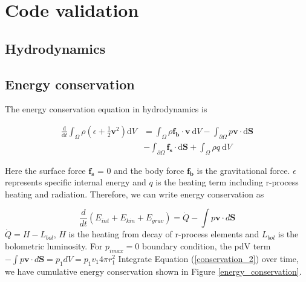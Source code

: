 \documentclass[fleqn,usenatbib]{mnras}
\begin{document}
\section{Code validation}
\subsection{Hydrodynamics}
\subsection{Energy conservation}

The energy conservation equation in hydrodynamics is 

 \begin{equation}
 \label{conservation_1}
 \begin{aligned}
 	 	\frac{\mathrm{d}}{\mathrm{d} t} \int_{\Omega} \rho\left(\epsilon+\frac{1}{2} \boldsymbol{v}^{2}\right) \mathrm{d} V & =\int_{\Omega} \rho \boldsymbol{f_b} \cdot \boldsymbol{v} \mathrm{~d} V -\int_{\partial \Omega} p \boldsymbol{v} \cdot \mathrm{d} \boldsymbol{S} \\&-\int_{\partial \Omega} \boldsymbol{f_s} \cdot \mathrm{d} \boldsymbol{S}+\int_{\Omega} \rho q \mathrm{~d}V
 \end{aligned}
 \end{equation}
 
 Here the surface force $\boldsymbol{f_s}$ = 0 and the body force $\boldsymbol{f_b}$ is the gravitational force. $\epsilon$ represents specific internal energy and $q$ is the heating term including r-process heating and radiation. Therefore, we can write energy conservation as
 



\begin{equation}
\label{conservation_2}
	\frac{d}{dt}(E_{int} + E_{kin}+E_{grav}) = \dot Q - \int p \boldsymbol{v} \cdot d \boldsymbol{S} 
\end{equation}
$\dot Q = H - L_{bol}$, $H$ is the heating from decay of r-process elements and $L_{bol}$ is the bolometric luminosity. For $p_{imax}=0$ boundary condition, the pdV term $-\int p \boldsymbol{v} \cdot d \boldsymbol{S} = p_{1} dV = p_{1} v_1 4\pi r_1^2$  
Integrate Equation (\ref{conservation_2}) over time, we have cumulative energy conservation shown in Figure \ref{energy_conservation}.
 
\end{document}
